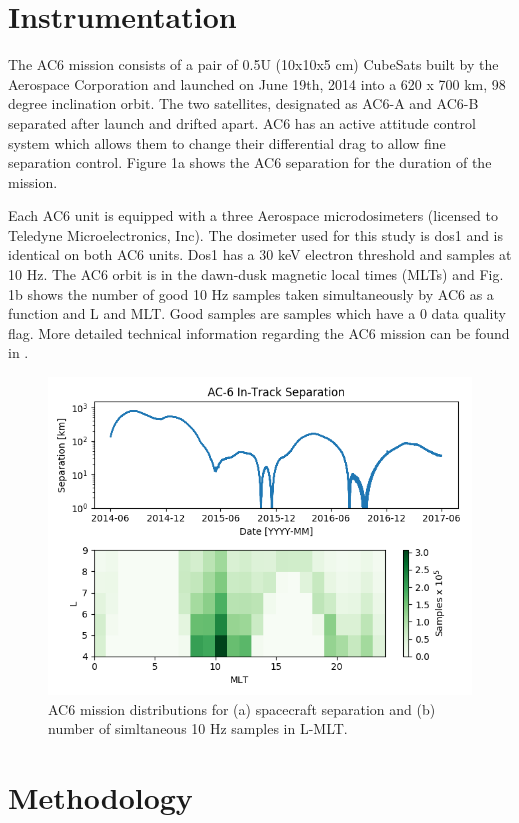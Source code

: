 \documentclass[draft]{agujournal2019}
\begin{document}
\section{Instrumentation}
The AC6 mission consists of a pair of 0.5U (10x10x5 cm) CubeSats built by the Aerospace Corporation and launched on June 19th, 2014 into a 620 x 700 km, 98 degree inclination orbit. The two satellites, designated as AC6-A and AC6-B separated after launch and drifted apart. AC6 has an active attitude control system which allows them to change their differential drag to allow fine separation control. Figure 1a shows the AC6 separation for the duration of the mission.

Each AC6 unit is equipped with a three Aerospace microdosimeters (licensed to Teledyne Microelectronics, Inc). The dosimeter used for this study is dos1 and is identical on both AC6 units. Dos1 has a 30 keV electron threshold and samples at 10 Hz. The AC6 orbit is in the dawn-dusk magnetic local times (MLTs) and Fig. 1b shows the number of good 10 Hz samples taken simultaneously by AC6 as a function and L and MLT. Good samples are samples which have a 0 data quality flag. More detailed technical information regarding the AC6 mission can be found in .

\begin{figure}
\includegraphics[width=\textwidth]{fig1.png}
\caption{AC6 mission distributions for (a) spacecraft separation and (b) number of simltaneous 10 Hz samples in L-MLT.} \label{fig1}
\end{figure}

\section{Methodology}
\end{document}
